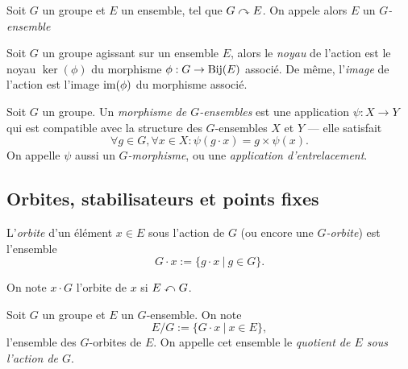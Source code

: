 \begin{notation}
	Soit $G$ un groupe et $E$ un ensemble, tel que $G \curvearrowright E$.
	On appele alors $E$ un \emph{$G$-ensemble}
\end{notation}

\begin{definition}
	Soit $G$ un groupe agissant sur un ensemble $E$,
	alors le \emph{noyau} de l'action est le noyau $\ker(\phi)$ du morphisme
	$\phi : G \to \operatorname{Bij}(E)$ associé. De même, l'\emph{image}
	de l'action est l'image $\operatorname{im}(\phi)$ du morphisme associé.
\end{definition}

\begin{definition}
	Soit $G$ un groupe. Un \emph{morphisme de $G$-ensembles} est une
	application $\psi : X \to Y$ qui est compatible avec
	la structure des $G$-ensembles $X$ et $Y$ --- elle satisfait
	\begin{equation*}
		\forall g \in G, \forall x \in X:
			\psi(g \cdot x) = g \times \psi(x).
	\end{equation*}
	On appelle $\psi$ aussi un \emph{$G$-morphisme},
	ou une \emph{application d'entrelacement}.
\end{definition}

\subsection{Orbites, stabilisateurs et points fixes}

\begin{definition}
	L'\emph{orbite} d'un élément $x \in E$ sous l'action de $G$
	(ou encore une \emph{$G$-orbite}) est l'ensemble
	\begin{equation*}
		G \cdot x := \{g \cdot x\ |\ g \in G\}.
	\end{equation*}
\end{definition}

\begin{notation}
	On note $x \cdot G$ l'orbite de $x$ si $E \curvearrowleft G$.
\end{notation}

\begin{definition}
	Soit $G$ un groupe et $E$ un $G$-ensemble. 
	On note
	\begin{equation*}
		E / G := \{ G \cdot x\ |\ x \in E\}, 	
	\end{equation*}
	l'ensemble des $G$-orbites de $E$. On appelle cet
	ensemble le \emph{quotient de $E$ sous l'action de $G$}.
\end{definition}

